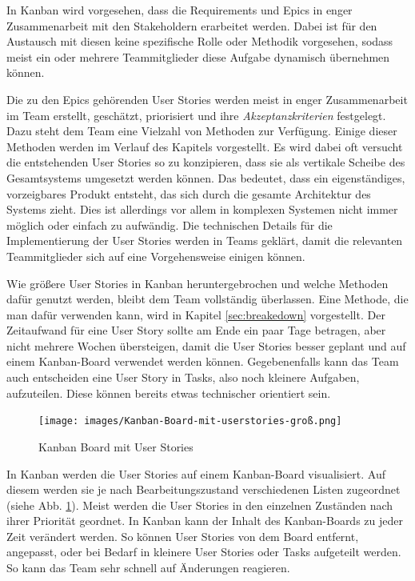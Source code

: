\documentclass[acmtog]{acmart}
\begin{document}
In Kanban wird vorgesehen, dass die Requirements und Epics in enger Zusammenarbeit mit
den Stakeholdern erarbeitet werden. Dabei ist für den Austausch mit diesen keine
spezifische Rolle oder Methodik vorgesehen, sodass meist ein oder mehrere Teammitglieder
diese Aufgabe dynamisch übernehmen können. \cite{agileprocesses}

Die zu den Epics gehörenden User Stories werden meist in enger Zusammenarbeit im Team erstellt,
geschätzt, priorisiert und ihre \emph{Akzeptanzkriterien} festgelegt. Dazu steht dem Team eine Vielzahl
von Methoden zur Verfügung. Einige dieser Methoden werden im Verlauf des Kapitels vorgestellt.
Es wird dabei oft versucht die entstehenden User Stories so zu konzipieren, dass sie als vertikale
Scheibe des Gesamtsystems umgesetzt werden können. Das bedeutet, dass ein eigenständiges, vorzeigbares
Produkt entsteht, das sich durch die gesamte Architektur des Systems zieht. Dies ist allerdings
vor allem in komplexen Systemen nicht immer möglich oder einfach zu aufwändig. Die technischen Details für die Implementierung
der User Stories werden in Teams geklärt, damit die relevanten Teammitglieder sich auf eine Vorgehensweise
einigen können. \cite{agileprocesses}

Wie größere User Stories in Kanban heruntergebrochen und welche Methoden dafür genutzt werden, bleibt
dem Team vollständig überlassen. Eine Methode, die man dafür verwenden kann, wird in Kapitel \ref{sec:breakedown} vorgestellt.
Der Zeitaufwand für eine User Story sollte am Ende ein paar Tage betragen, aber nicht mehrere Wochen übersteigen, damit die User Stories besser
geplant und auf einem Kanban-Board verwendet werden können. Gegebenenfalls kann das Team auch entscheiden eine User Story in Tasks, also noch
kleinere Aufgaben, aufzuteilen. Diese können bereits etwas technischer orientiert sein. \cite{agileprocesses}

\begin{figure}[t]
	\centering
	\texttt{[image: images/Kanban-Board-mit-userstories-groß.png]}
	\caption{Kanban Board mit User Stories}
	\label{fig:kanban-board}
	\Description{}
\end{figure}

In Kanban werden die User Stories auf einem Kanban-Board visualisiert. Auf diesem werden sie je nach Bearbeitungszustand verschiedenen
Listen zugeordnet (siehe Abb. \ref{fig:kanban-board}). Meist werden die User Stories in den einzelnen
Zuständen nach ihrer Priorität geordnet. In Kanban kann der Inhalt des Kanban-Boards zu jeder Zeit verändert werden.
So können User Stories von dem Board entfernt, angepasst, oder bei Bedarf in kleinere User Stories oder Tasks aufgeteilt werden. So kann das Team sehr schnell
auf Änderungen reagieren. \cite{agileprocesses}
\end{document}

